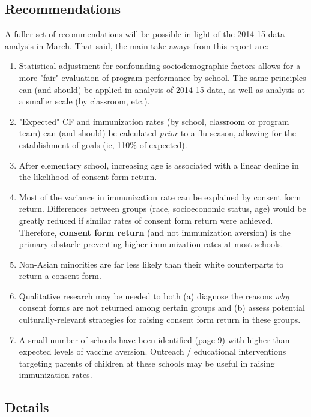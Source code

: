 \documentclass{article}
\begin{document}
\subsection*{Recommendations}
A fuller set of recommendations will be possible in light of the 2014-15 data analysis in March.  That said, the main take-aways from this report are: \begin{enumerate}
\item Statistical adjustment for confounding sociodemographic factors allows for a more "fair" evaluation of program performance by school.  The same principles can (and should) be applied in analysis of 2014-15 data, as well as analysis at a smaller scale (by classroom, etc.).  
\item "Expected" CF and immunization rates (by school, classroom or program team) can (and should) be calculated \emph{prior} to a flu season, allowing for the establishment of goals (ie, 110\% of expected).
\item After elementary school, increasing age is associated with a linear decline in the likelihood of consent form return.
\item Most of the variance in immunization rate can be explained by consent form return.  Differences between groups (race, socioeconomic status, age) would be greatly reduced if similar rates of consent form return were achieved.  Therefore, \textbf{consent form return} (and not immunization aversion) is the primary obstacle preventing higher immunization rates at most schools.
\item Non-Asian minorities are far less likely than their white counterparts to return a consent form.
\item Qualitative research may be needed to both (a) diagnose the reasons \emph{why} consent forms are not returned among certain groups and (b) assess potential culturally-relevant strategies for raising consent form return in these groups.  
\item A small number of schools have been identified (page 9) with higher than expected levels of vaccine aversion. Outreach / educational interventions targeting parents of children at these schools may be useful in raising immunization rates.
\end{enumerate}

\begin{center}
\section*{Details}
\end{center}
\end{document}

